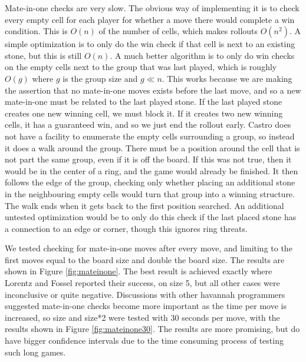 Mate-in-one checks are very slow. The obvious way of implementing it is to check every empty cell for each player for whether a move there would complete a win condition. This is $O(n)$ of the number of cells, which makes rollouts $O(n^2)$. A simple optimization is to only do the win check if that cell is next to an existing stone, but this is still $O(n)$. A much better algorithm is to only do win checks on the empty cells next to the group that was last played, which is roughly $O(g)$ where $g$ is the group size and $g \ll n$. This works because we are making the assertion that no mate-in-one moves exists before the last move, and so a new mate-in-one must be related to the last played stone. If the last played stone creates one new winning cell, we must block it. If it creates two new winning cells, it has a guaranteed win, and so we just end the rollout early. Castro does not have a facility to enumerate the empty cells surrounding a group, so instead it does a walk around the group. There must be a position around the cell that is not part the same group, even if it is off the board. If this was not true, then it would be in the center of a ring, and the game would already be finished. It then follows the edge of the group, checking only whether placing an additional stone in the neighbouring empty cells would turn that group into a winning structure. The walk ends when it gets back to the first position searched. An additional untested optimization would be to only do this check if the last placed stone has a connection to an edge or corner, though this ignores ring threats.

We tested checking for mate-in-one moves after every move, and limiting to the first moves equal to the board size and double the board size. The results are shown in Figure \ref{fig:mateinone}. The best result is achieved exactly where Lorentz and Fossel reported their success, on size 5, but all other cases were inconclusive or quite negative. Discussions with other havannah programmers suggested mate-in-one checks become more important as the time per move is increased, so size and size*2 were tested with 30 seconds per move, with the results shown in Figure \ref{fig:mateinone30}. The results are more promising, but do have bigger confidence intervals due to the time consuming process of testing such long games.

